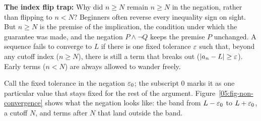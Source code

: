 \begin{trapbox}
\textbf{The index flip trap:} Why did $n \ge N$ remain $n \ge N$ in the negation, rather than flipping to $n < N$? Beginners often reverse every inequality sign on sight. But $n \ge N$ is the premise of the implication, the condition under which the guarantee was made, and the negation $P \land \neg Q$ keeps the premise $P$ unchanged. A sequence fails to converge to $L$ if there is one fixed tolerance $\varepsilon$ such that, beyond any cutoff index ($n \ge N$), there is still a term that breaks out ($|a_n - L| \ge \varepsilon$). Early terms ($n < N$) are always allowed to wander freely.
\end{trapbox}

Call the fixed tolerance in the negation $\varepsilon_0$; the subscript $0$ marks it as one particular value that stays fixed for the rest of the argument. Figure~\ref{05:fig-non-convergence} shows what the negation looks like: the band from $L - \varepsilon_0$ to $L + \varepsilon_0$, a cutoff $N$, and terms after $N$ that land outside the band.

